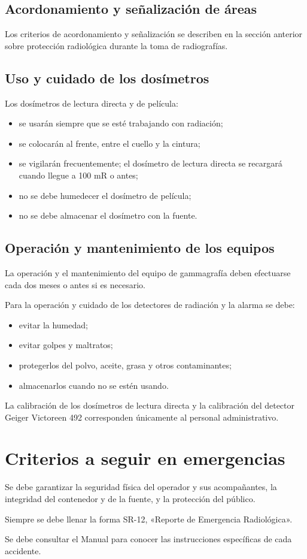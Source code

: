 \subsection{Acordonamiento y señalización de áreas}

Los criterios de acordonamiento y señalización se describen en la sección anterior sobre protección radiológica durante la toma de radiografías.

\subsection{Uso y cuidado de los dosímetros}

Los dosímetros de lectura directa y de película:
\begin{itemize}
  \item se usarán siempre que se esté trabajando con radiación;
  \item se colocarán al frente, entre el cuello y la cintura;
  \item se vigilarán frecuentemente; el dosímetro de lectura directa se recargará cuando llegue a 100 mR o antes;
  \item no se debe humedecer el dosímetro de película;
  \item no se debe almacenar el dosímetro con la fuente.
\end{itemize}

\subsection{Operación y mantenimiento de los equipos}

La operación y el mantenimiento del equipo de gammagrafía deben efectuarse cada dos meses o antes si es necesario.

Para la operación y cuidado de los detectores de radiación y la alarma se debe:
\begin{itemize}
  \item evitar la humedad;
  \item evitar golpes y maltratos;
  \item protegerlos del polvo, aceite, grasa y otros contaminantes;
  \item almacenarlos cuando no se estén usando.
\end{itemize}

La calibración de los dosímetros de lectura directa y la calibración del detector Geiger Victoreen 492 corresponden únicamente al personal administrativo.

\section{Criterios a seguir en emergencias}

Se debe garantizar la seguridad física del operador y sus acompañantes, la integridad del contenedor y de la fuente, y la protección del público.

Siempre se debe llenar la forma SR-12, «Reporte de Emergencia Radiológica».

Se debe consultar el Manual para conocer las instrucciones específicas de cada accidente.
